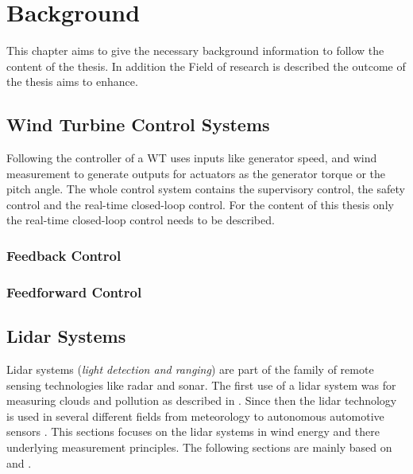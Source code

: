 \chapter{Background} \label{cha:Back}
This chapter aims to give the necessary background information to follow the content of the thesis. In addition the Field of research is described the outcome of the thesis aims to enhance.
\section{Wind Turbine Control Systems}\label{sec:ControlSys}
Following \cite{Burton2011} the controller of a \gls{WT} uses inputs like generator speed, and wind measurement to generate outputs for actuators as the generator torque or the pitch angle. The whole control system contains the supervisory control, the safety control and the real-time closed-loop control. For the content of this thesis only the real-time closed-loop control needs to be described.



\subsection{Feedback Control}\label{subsec:FB-Contr}









\subsection{Feedforward Control}\label{subsec:FF-Contr}





\section{Lidar Systems}\label{sec:LidarSys}
Lidar systems (\textit{light detection and ranging}) are part of the family of remote sensing technologies like radar and sonar. The first use of a lidar system was for measuring clouds and pollution as described in \cite{Goyer1963}. Since then the \gls{lidar} technology is used in several different fields from meteorology \cite{Goyer1963} to autonomous automotive sensors \cite{EDN2016}. This sections focuses on the \gls{lidar} systems in wind energy and there underlying measurement principles. The following sections are mainly based on \cite{DTUlidar2013} and \cite{Schlipf2015}.

